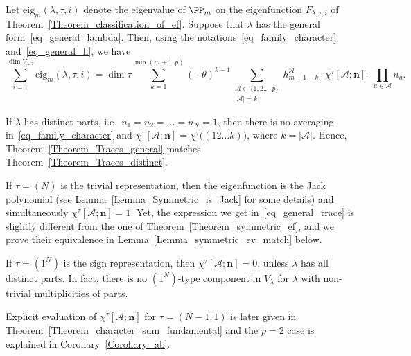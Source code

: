 \begin{theorem} \label{Theorem_Traces_general}
 Let $\mathrm{eig}_m(\lambda,\tau,i)$ denote the eigenvalue of $\PP_m$ on the eigenfunction $F_{\lambda,\tau,i}$  of Theorem~\ref{Theorem_classification_of_ef}. Suppose that $\lambda$ has the general form~\eqref{eq_general_lambda}. Then, using the notations~\eqref{eq_family_character} and~\eqref{eq_general_h}, we have
 \begin{equation}
 \label{eq_general_trace}
  \sum_{i=1}^{\dim V_{\lambda,\tau}} \mathrm{eig}_m(\lambda,\tau,i) = \dim \tau \sum_{k=1}^{\min(m+1,p)}  (-\theta)^{k-1} \sum_{\begin{smallmatrix}\mathcal A\subset \{1,2\dots,p\}\\ |\mathcal A|=k\end{smallmatrix}}  h^{\mathcal A}_{m+1-k} \cdot   \chi^\tau[\mathcal A; \mathbf n]\cdot \prod_{a\in \mathcal A} n_a.
 \end{equation}
\end{theorem}

If $\lambda$ has distinct parts, i.e.\ $n_1=n_2=\dots=n_N=1$, then there is no averaging in~\eqref{eq_family_character} and $ \chi^\tau[\mathcal A; \mathbf n]=\chi^\tau \bigl( (12\dots k) \bigr)$, where $k=|\mathcal A|$. Hence, Theorem~\ref{Theorem_Traces_general} matches Theorem~\ref{Theorem_Traces_distinct}.

If $\tau=(N)$ is the trivial representation, then the eigenfunction is the Jack polynomial (see Lemma~\ref{Lemma_Symmetric_is_Jack} for some details) and simultaneously $\chi^\tau[\mathcal A; \mathbf n]=1$. Yet, the expression we get in~\eqref{eq_general_trace} is slightly different from the one of Theorem~\ref{Theorem_symmetric_ef}, and we prove their equivalence in Lemma~\ref{Lemma_symmetric_ev_match} below.

If $\tau=(1^N)$ is the sign representation, then $\chi^{\tau}[\mathcal A; \mathbf n]=0$, unless $\lambda$ has all distinct parts. In fact, there is no $(1^N)$-type component in $V_\lambda$ for $\lambda$ with non-trivial multiplicities of parts.

Explicit evaluation of $\chi^{\tau}[\mathcal A; \mathbf n]$ for $\tau=(N-1,1)$ is later given in Theorem~\ref{Theorem_character_sum_fundamental} and the $p=2$ case is explained in Corollary~\ref{Corollary_ab}.

